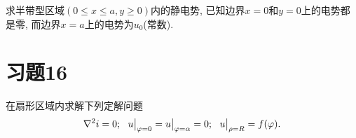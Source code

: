\begin{yyEx}
	求半带型区域$(0\leqslant x\leqslant a,y\geqslant 0)$内的静电势, 已知边界$x = 0$和$y = 0$上的电势都是零, 而边界$x = a$上的电势为$u_0$(常数).
\end{yyEx}

\section{习题16}

\begin{yyEx}
	在扇形区域内求解下列定解问题
	\begin{equation*}
		\nabla^2i = 0;~~u\big|_{\varphi = 0} = u\big|_{\varphi = \alpha} = 0;~~u\big|_{\rho = R} = f(\varphi).
	\end{equation*}
\end{yyEx}